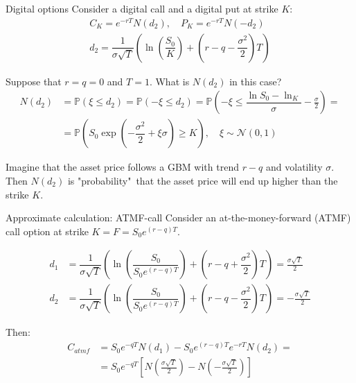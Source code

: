 \documentclass{beamer}
\begin{document}
\begin{frame}{Digital options}
\justify
Consider a digital call and a digital put at strike $K$:
\begin{align*}
C_K = e^{-rT}N(d_2), \quad P_K = e^{-rT}N(-d_2) \\
d_2 = \dfrac{1}{\sigma\sqrt{T}}\left( \ln\left(\dfrac{S_0}{K}\right) + \left(r -q- \dfrac{\sigma^2}{2}\right)T\right)
\end{align*}

\justify
Suppose that $r=q=0$ and $T=1$. What is $N(d_2)$ in this case?
\begin{align*}
N(d_2) &= \mathbb{P}(\xi \le d_2) = 
\mathbb{P}(-\xi \le d_2) = \mathbb{P}\left(-\xi \le \dfrac{\ln S_0 - \ln_K}{\sigma} - \frac{\sigma}{2}\right) = \\
&= \mathbb{P}\left(S_0\exp\left(-\dfrac{\sigma^2}{2} + \xi\sigma\right) \ge K\right),
\quad \xi \sim \mathcal{N}(0,1)
\end{align*}

\justify
Imagine that the asset price follows a GBM with trend $r-q$ and volatility $\sigma$. Then $N(d_2)$ is "probability"\ that the asset price will end up higher than the strike $K$.

\end{frame}




\begin{frame}{Approximate calculation: ATMF-call}
\justify
Consider an at-the-money-forward (ATMF) call option at strike $K = F = S_0e^{(r-q)T}$.

\begin{align*}
d_1 &= \dfrac{1}{\sigma\sqrt{T}}\left( \ln\left(\dfrac{S_0}{S_0e^{(r-q)T}}\right) + \left(r -q + \dfrac{\sigma^2}{2}\right)T\right) = \frac{\sigma \sqrt{T}}{2} \\
d_2 &= \dfrac{1}{\sigma\sqrt{T}}\left( \ln\left(\dfrac{S_0}{S_0e^{(r-q)T}}\right) + \left(r -q- \dfrac{\sigma^2}{2}\right)T\right) = -\frac{\sigma \sqrt{T}}{2}
\end{align*}

Then:
\begin{align*}
C_{atmf} &= S_0e^{-qT}N(d_1) - S_0e^{(r-q)T}e^{-rT}N(d_2) = \\
&= S_0e^{-qT}\left[
N\left(\frac{\sigma \sqrt{T}}{2}\right) - N\left(-\frac{\sigma \sqrt{T}}{2}\right)
\right]
\end{align*}
\end{frame}
\end{document}
